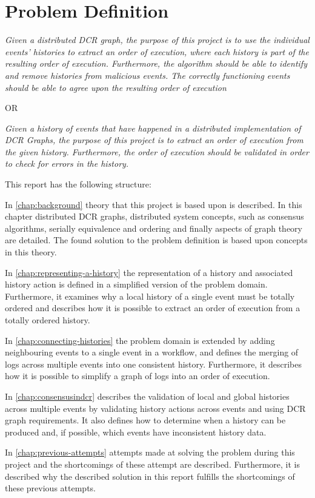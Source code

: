\section{Problem Definition} %
	\textit{Given a distributed DCR graph, the purpose of this project is to use the individual events' histories to extract an order of execution, where each history is part of the resulting order of execution. Furthermore, the algorithm should be able to identify and remove histories from malicious events. The correctly functioning events should be able to agree upon the resulting order of execution}
	
	OR
	
	\textit{Given a history of events that have happened in a distributed implementation of DCR Graphs, the purpose of this project is to extract an order of execution from the given history. Furthermore, the order of execution should be validated in order to check for errors  in the history.}
	
	\vspace{0.6cm}
	
	\newpar
	This report has the following structure:
	
	\newpar
	In \autoref{chap:background} theory that this project is based upon is described. In this chapter distributed DCR graphs, distributed system concepts, such as consensus algorithms, serially equivalence and ordering and finally aspects of graph theory are detailed.
	The found solution to the problem definition is based upon concepts in this theory.
		
	\newpar
	In \autoref{chap:representing-a-history} the representation of a history and associated history action is defined in a simplified version of the problem domain. 
	Furthermore, it examines why a local history of a single event must be totally ordered and describes how it is possible to extract an order of execution from a totally ordered history.
		
	\newpar
	In \autoref{chap:connecting-histories} the problem domain is extended by adding neighbouring events to a single event in a workflow, and defines the merging of logs across multiple events into one consistent history. Furthermore, it describes how it is possible to simplify a graph of logs into an order of execution.
	
	\newpar
	In \autoref{chap:consensusindcr} describes the validation of local and global histories across multiple events by validating history actions across events and using DCR graph requirements. It also defines how to determine when a history can be produced and, if possible, which events have inconsistent history data.
	
	\newpar
	In \autoref{chap:previous-attempts} attempts made at solving the problem during this project and the shortcomings of these attempt are described. Furthermore, it is described why the described solution in this report fulfills the shortcomings of these previous attempts. 
		
	
